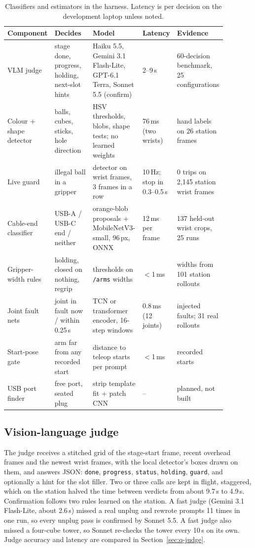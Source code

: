 \documentclass[10pt]{article}
\begin{document}
\begin{table}[t]
\centering
\small
\caption{Classifiers and estimators in the harness. Latency is per decision on the development laptop unless noted.}
\label{tab:classifiers}
\begin{tabular}{@{}p{0.14\linewidth}p{0.19\linewidth}p{0.23\linewidth}p{0.11\linewidth}p{0.21\linewidth}@{}}
\toprule
Component & Decides & Model & Latency & Evidence \\
\midrule
VLM judge & stage done, progress, holding, next-slot hints & Haiku 5.5, Gemini 3.1 Flash-Lite, GPT-6.1 Terra, Sonnet 5.5 (confirm) & 2--9\,s & 60-decision benchmark, 25 configurations \\
Colour + shape detector & balls, cubes, sticks, hole direction & HSV thresholds, blobs, shape tests; no learned weights & 76\,ms (two wrists) & hand labels on 26 station frames \\
Live guard & illegal ball in a gripper & detector on wrist frames, 3 frames in a row & 10\,Hz; stop in 0.3--0.5\,s & 0 trips on 2{,}145 station wrist frames \\
Cable-end classifier & USB-A / USB-C end / neither & orange-blob proposals + MobileNetV3-small, 96\,px, ONNX & 12\,ms per frame & 137 held-out wrist crops, 25 runs \\
Gripper-width rules & holding, closed on nothing, regrip & thresholds on \texttt{/arms} widths & $<$1\,ms & widths from 101 station rollouts \\
Joint fault nets & joint in fault now / within 0.25\,s & TCN or transformer encoder, 16-step windows & 0.8\,ms (12 joints) & injected faults; 31 real rollouts \\
Start-pose gate & arm far from any recorded start & distance to teleop starts per prompt & $<$1\,ms & recorded starts \\
\midrule
USB port finder & free port, seated plug & strip template fit + patch CNN & -- & planned, not built \\
\bottomrule
\end{tabular}
\end{table}

\subsection{Vision-language judge}
The judge receives a stitched grid of the stage-start frame, recent overhead frames and the newest wrist frames, with the
local detector's boxes drawn on them, and answers JSON: \texttt{done}, \texttt{progress}, \texttt{status}, \texttt{holding},
\texttt{guard}, and optionally a hint for the slot filler. Two or three calls are kept in flight, staggered, which on the
station halved the time between verdicts from about 9.7\,s to 4.9\,s. Confirmation follows two rules learned on the station.
A fast judge (Gemini 3.1 Flash-Lite, about 2.6\,s) missed a real unplug and rewrote prompts 11 times in one run, so every unplug
pass is confirmed by Sonnet 5.5. A fast judge also missed a four-cube tower, so Sonnet re-checks the tower every 10\,s on its own.
Judge accuracy and latency are compared in Section~\ref{sec:q-judge}.
\end{document}
